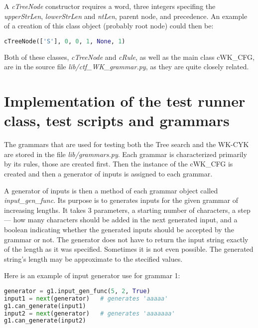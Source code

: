 A \textit{cTreeNode} constructor requires a word, three integers specifing the \textit{upperStrLen}, \textit{lowerStrLen} and \textit{ntLen}, parent node, and precedence. An example of a creation of this class object (probably root node) could then be:

\begin{lstlisting}[language=Python]
  cTreeNode(['S'], 0, 0, 1, None, 1)
\end{lstlisting}

\bigskip

Both of these classes, \textit{cTreeNode} and \textit{cRule}, as well as the main class cWK\_CFG, are in the source file \textit{lib/ctf\_WK\_grammar.py}, as they are quite closely related.


\section{Implementation of the test runner class, test scripts and grammars}
The grammars that are used for testing both the Tree search and the WK-CYK are stored in the file \textit{lib/grammars.py}. Each grammar is characterized primarily by its rules, those are created first. Then the instance of the cWK\_CFG is created and then a generator of inputs is assigned to each grammar.

A generator of inputs is then a method of each grammar object called \textit{input\_gen\_func}. Its purpose is to generates inputs for the given grammar of increasing lengths. It takes 3 parameters, a starting number of characters, a step --- how many characters should be added in the next generated input, and a boolean indicating whether the generated inputs should be accepted by the grammar or not. The generator does not have to return the input string exactly of the length as it was specified. Sometimes it is not even possible. The generated string's length may be approximate to the stecified values.

Here is an example of input generator use for grammar 1:
\begin{lstlisting}[language=Python]
generator = g1.input_gen_func(5, 2, True)
input1 = next(generator)   # generates 'aaaaa'
g1.can_generate(input1)
input2 = next(generator)   # generates 'aaaaaaa'
g1.can_generate(input2)
\end{lstlisting}

